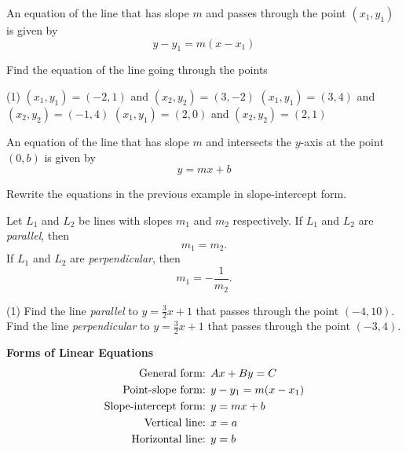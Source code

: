 \documentclass[../mathNotesPreamble]{subfiles}
\begin{document}
    \begin{defn*}
      An equation of the line that has slope $m$ and passes through the point $(x_1,y_1)$ is given by
        \[y-y_1=m(x-x_1)\]
    \end{defn*}
    
    \begin{ex*}
      Find the equation of the line going through the points
    \end{ex*}
    \begin{extasks}[after-item-skip=\stretch{1}](1)
      \task $(x_1,y_1)=(-2,1)$ and $(x_2,y_2)=(3,-2)$
      \task $(x_1,y_1)=(3,4)$ and $(x_2,y_2)=(-1,4)$
      \task $(x_1,y_1)=(2,0)$ and $(x_2,y_2)=(2,1)$
    \end{extasks}
    \pagebreak
    
    \begin{defn*}
      An equation of the line that has slope $m$ and intersects the $y$-axis at the point $(0,b)$ is given by
        \[y=mx+b\]
    \end{defn*}
    \begin{ex*}
      Rewrite the equations in the previous example in slope-intercept form.
    \end{ex*}
    \pagebreak
    
    \begin{defn*}
      Let $L_1$ and $L_2$ be lines with slopes $m_1$ and $m_2$ respectively. If $L_1$ and $L_2$ are \emph{parallel}, then
        \[m_1=m_2.\]
      If $L_1$ and $L_2$ are \emph{perpendicular}, then
        \[m_1=-\frac{1}{m_2}.\]
    \end{defn*}
    
    \begin{ex*}\mbox{}
      \begin{extasks}[after-item-skip=\stretch{1}](1)
        \task Find the line \emph{parallel} to $y=\frac{3}{2}x+1$ that passes through the point $(-4,10)$.
        \task Find the line \emph{perpendicular} to $y=\frac{3}{2}x+1$ that passes through the point $(-3,4)$.
      \end{extasks}
    \end{ex*}
    \pagebreak

    \textbf{Forms of Linear Equations}\\
      \begin{align*}
        \textnormal{General form: }& Ax+By=C\\
        \textnormal{Point-slope form: }& y-y_1=m(x-x_1)\\
        \textnormal{Slope-intercept form: }& y=mx+b\\
        \textnormal{Vertical line: }& x=a\\
        \textnormal{Horizontal line: }& y=b
      \end{align*}

  \pagebreak
\end{document}
